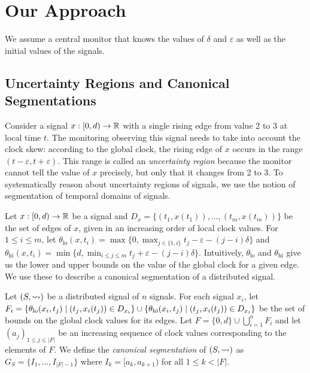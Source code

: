 \section{Our Approach}
We assume a central monitor that knows the values of $\delta$ and $\varepsilon$ as well as the initial values of the signals.

\subsection{Uncertainty Regions and Canonical Segmentations} \label{sec:segment}

Consider a signal $x : [0,d) \to \mathbb{R}$ with a single rising edge from value 2 to 3 at local time $t$.
The monitoring observing this signal needs to take into account the clock skew: according to the global clock, the rising edge of $x$ occurs in the range $(t - \varepsilon, t + \varepsilon)$.
This range is called an \emph{uncertainty region} because the monitor cannot tell the value of $x$ precisely, but only that it changes from 2 to 3.
To systematically reason about uncertainty regions of signals, we use the notion of segmentation of temporal domains of signals.

Let $x : [0,d) \to \mathbb{R}$ be a signal and $D_x = \{(t_1, x(t_1)), \ldots, (t_m, x(t_m))\}$ be the set of edges of $x$, given in an increasing order of local clock values.
For $1 \leq i \leq m$, let $\theta_{\text{lo}}(x,t_i) = \max\{0, \max_{j \in \{1, i\}} t_j - \varepsilon - (j-i)\delta\}$ and $\theta_{\text{hi}}(x,t_i) = \min\{d, \min_{i \leq j \leq m} t_j + \varepsilon - (j-i)\delta\}$.
Intuitively, $\theta_{\text{lo}}$ and $\theta_{\text{hi}}$ give us the lower and upper bounds on the value of the global clock for a given edge.
We use these to describe a canonical segmentation of a distributed signal.

Let $(S,{\rightsquigarrow})$ be a distributed signal of $n$ signals.
For each signal $x_i$, let $F_i = \{\theta_{\text{lo}}(x_i, t_j) \st (t_j, x_i(t_j)) \in D_{x_i}\} \cup \{\theta_{\text{hi}}(x_i, t_j) \st (t_j, x_i(t_j)) \in D_{x_i}\}$ be the set of bounds on the global clock values for its edges.
Let $F = \{0, d\} \cup \bigcup_{i = 1}^{n} F_i$ and let $(a_j)_{1 \leq j \leq |F|}$ be an increasing sequence of clock values corresponding to the elements of $F$.
We define the \emph{canonical segmentation} of $(S,{\rightsquigarrow})$ as $G_S = \{I_1, \ldots, I_{|F| - 1}\}$ where $I_k = [a_k, a_{k+1})$ for all $1 \leq k < |F|$.

